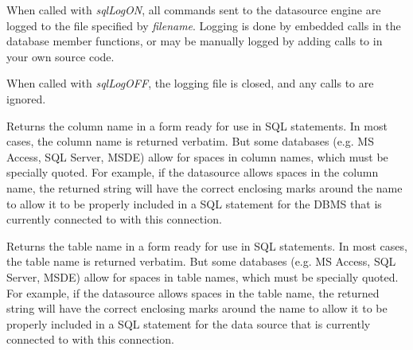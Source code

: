 
When called with {\it sqlLogON}, all commands sent to the datasource engine are logged to the file specified by {\it filename}.  Logging is done by embedded  calls in the database member functions, or may be manually logged by adding calls to  in your own source code.

When called with {\it sqlLogOFF}, the logging file is closed, and any calls to  are ignored.

\label{wxdbsqlcolumnname}


Returns the column name in a form ready for use in SQL statements.
In most cases, the column name is returned verbatim.  But some databases
(e.g. MS Access, SQL Server, MSDE) allow for spaces in column names, which
must be specially quoted.  For example, if the datasource allows spaces
in the column name, the returned string will have the correct enclosing
marks around the name to allow it to be properly included in a SQL statement
for the DBMS that is currently connected to with this connection.





\label{wxdbsqltablename}


Returns the table name in a form ready for use in SQL statements.
In most cases, the table name is returned verbatim.  But some databases
(e.g. MS Access, SQL Server, MSDE) allow for spaces in table names, which
must be specially quoted.  For example, if the datasource allows spaces
in the table name, the returned string will have the correct enclosing
marks around the name to allow it to be properly included in a SQL statement
for the data source that is currently connected to with this connection.

